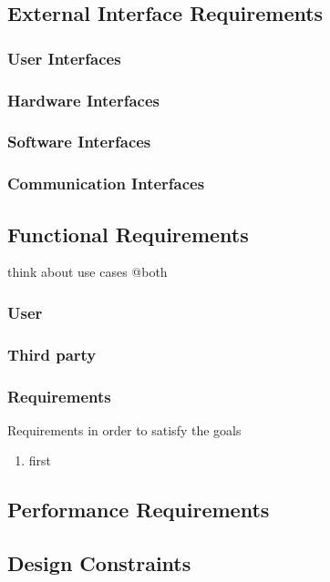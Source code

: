 \subsection{External Interface Requirements}
\subsubsection{User Interfaces}
\subsubsection{Hardware Interfaces}
\subsubsection{Software Interfaces}
\subsubsection{Communication Interfaces}


\subsection{Functional  Requirements}


think about use cases @both

\subsubsection{User}
\subsubsection{Third party}

\subsubsection{Requirements}
Requirements in order to satisfy the goals
\begin{enumerate}[label=R]
\item first
\end{enumerate}



\subsection{Performance Requirements}


\subsection{Design Constraints}%

